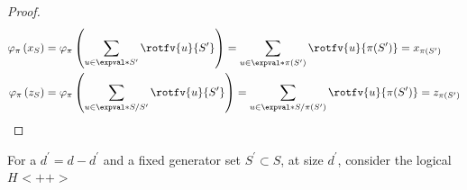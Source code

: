 \begin{proof}
\begin{equation*}
  \begin{split}
    \varphi_{\pi}\left( x_{S}  \right) &= \varphi_{\pi}\left( \sum_{u\in \expval*{S^{\prime}}}\rotfv{u}{S^{\prime}}  \right) =  \sum_{u\in \expval*{\pi(S^{\prime})}}\rotfv{u}{\pi(S^{\prime})} = x_{\pi(S^{\prime})} \\
    \varphi_{\pi}\left( z_{S}  \right) &= \varphi_{\pi}\left( \sum_{u\in \expval*{S/S^{\prime}}}\rotfv{u}{S^{\prime}}  \right) =  \sum_{u\in \expval*{S/\pi(S^{\prime})}}\rotfv{u}{\pi(S^{\prime})} = z_{\pi(S^{\prime})} \\
  \end{split}
\end{equation*}
\end{proof}
\begin{corollary}
  For a $d^{\prime} = d - d^{\prime}$ and a fixed generator set $S^{\prime}\subset S$, at size $d^{\prime}$, consider the logical $H_{}<++>$ 
\end{corollary}


